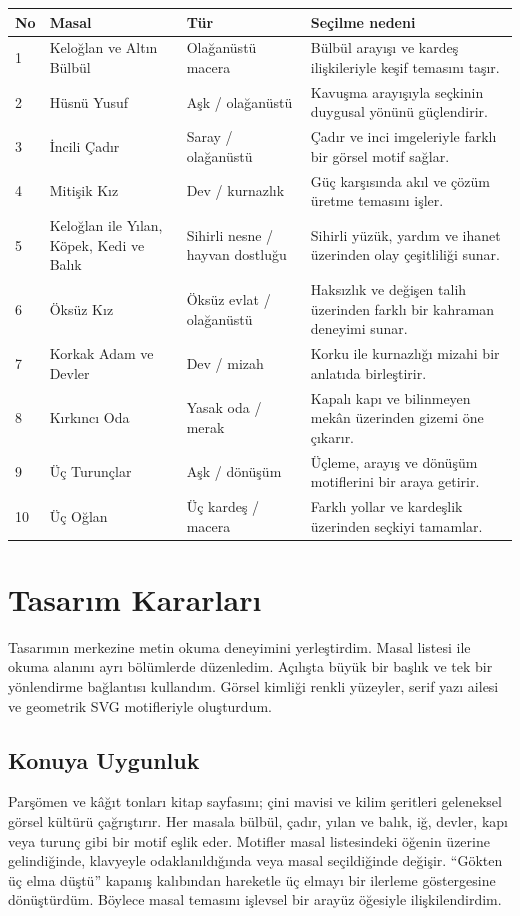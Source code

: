 \documentclass[12pt,a4paper]{article}
\begin{document}
\begin{longtable}{@{}p{0.5cm}>{\raggedright\arraybackslash}p{3.8cm}>{\raggedright\arraybackslash}p{2.4cm}>{\raggedright\arraybackslash}p{7cm}@{}}
\toprule No & \textbf{Masal} & \textbf{Tür} & \textbf{Seçilme nedeni}\\\midrule\endhead
1 & Keloğlan ve Altın Bülbül & Olağanüstü macera & Bülbül arayışı ve kardeş ilişkileriyle keşif temasını taşır.\\[6pt]
2 & Hüsnü Yusuf & Aşk / olağanüstü & Kavuşma arayışıyla seçkinin duygusal yönünü güçlendirir.\\[6pt]
3 & İncili Çadır & Saray / olağanüstü & Çadır ve inci imgeleriyle farklı bir görsel motif sağlar.\\[6pt]
4 & Mitişik Kız & Dev / kurnazlık & Güç karşısında akıl ve çözüm üretme temasını işler.\\[6pt]
5 & Keloğlan ile Yılan, Köpek, Kedi ve Balık & Sihirli nesne / hayvan dostluğu & Sihirli yüzük, yardım ve ihanet üzerinden olay çeşitliliği sunar.\\[6pt]
6 & Öksüz Kız & Öksüz evlat / olağanüstü & Haksızlık ve değişen talih üzerinden farklı bir kahraman deneyimi sunar.\\[6pt]
7 & Korkak Adam ve Devler & Dev / mizah & Korku ile kurnazlığı mizahi bir anlatıda birleştirir.\\[6pt]
8 & Kırkıncı Oda & Yasak oda / merak & Kapalı kapı ve bilinmeyen mekân üzerinden gizemi öne çıkarır.\\[6pt]
9 & Üç Turunçlar & Aşk / dönüşüm & Üçleme, arayış ve dönüşüm motiflerini bir araya getirir.\\[6pt]
10 & Üç Oğlan & Üç kardeş / macera & Farklı yollar ve kardeşlik üzerinden seçkiyi tamamlar.\\
\bottomrule
\end{longtable}

\section{Tasarım Kararları}
Tasarımın merkezine metin okuma deneyimini yerleştirdim. Masal listesi ile okuma alanını ayrı bölümlerde düzenledim. Açılışta büyük bir başlık ve tek bir yönlendirme bağlantısı kullandım. Görsel kimliği renkli yüzeyler, serif yazı ailesi ve geometrik SVG motifleriyle oluşturdum.

\subsection{Konuya Uygunluk}
Parşömen ve kâğıt tonları kitap sayfasını; çini mavisi ve kilim şeritleri geleneksel görsel kültürü çağrıştırır. Her masala bülbül, çadır, yılan ve balık, iğ, devler, kapı veya turunç gibi bir motif eşlik eder. Motifler masal listesindeki öğenin üzerine gelindiğinde, klavyeyle odaklanıldığında veya masal seçildiğinde değişir. ``Gökten üç elma düştü'' kapanış kalıbından hareketle üç elmayı bir ilerleme göstergesine dönüştürdüm. Böylece masal temasını işlevsel bir arayüz öğesiyle ilişkilendirdim.
\end{document}

